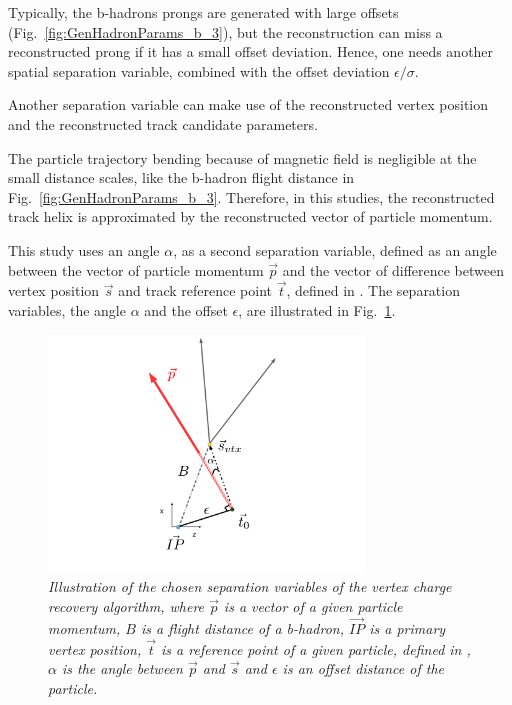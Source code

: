 Typically, the b-hadrons prongs are generated with large offsets (Fig.~\ref{fig:GenHadronParams_b_3}), but the reconstruction can miss a reconstructed prong if it has a small offset deviation. 
Hence, one needs another spatial separation variable, combined with the offset deviation $\epsilon/\sigma$. 

Another separation variable can make use of the reconstructed vertex position and the reconstructed track candidate parameters. 

The particle trajectory bending because of magnetic field is negligible at the small distance scales, like the b-hadron flight distance in Fig.~\ref{fig:GenHadronParams_b_3}. 
Therefore, in this studies, the reconstructed track helix is approximated by the reconstructed vector of particle momentum. 

This study uses an angle $\alpha$, as a second separation variable, defined as an angle between the vector of particle momentum $\vec{p}$ and the vector of difference between vertex position $\vec{s}$ and track reference point $\vec{t}$, defined in \cite{bib:LCIOtrack}. The separation variables, the angle $\alpha$ and the offset $\epsilon$, are illustrated in Fig.~\ref{fig:VtxRecovery_3}.

\begin{figure}[h]
{\centering
    \includegraphics[width=0.75\textwidth]{ILD/plots/recovery-graph.pdf}
    \caption{\sl Illustration of the chosen separation variables of the vertex charge recovery algorithm, where $\vec{p}$ is a vector of a given particle momentum, $B$ is a flight distance of a b-hadron, $\vec{IP}$ is a primary vertex position, $\vec{t}$ is a reference point of a given particle, defined in \cite{bib:LCIOtrack}, $\alpha$ is the angle between $\vec{p}$ and $\vec{s}$ and $\epsilon$ is an offset distance of the particle. %
    }
    \label{fig:VtxRecovery_3}
  }
\end{figure}

